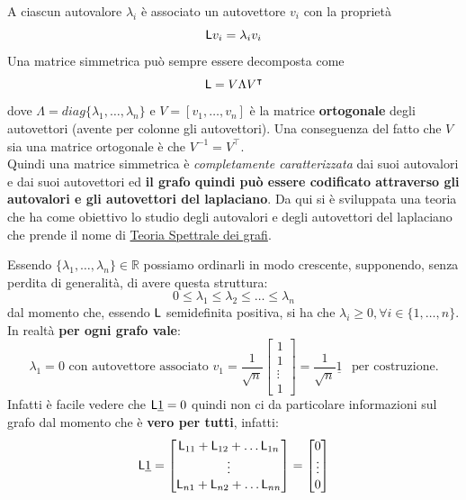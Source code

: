 A ciascun autovalore $\lambda_i$ \`e associato un autovettore $v_i$ con la propriet\`a
\begin{equation}
\mathsf{L} v_i = \lambda_i v_i
\end{equation}
Una matrice simmetrica pu\`o sempre essere decomposta come
\begin{equation}
\mathsf{L} = V \Lambda V^\intercal
\end{equation}
dove $\Lambda = diag\{\lambda_1, \dots, \lambda_n\}$ e $V = [v_1, \dots, v_n]$ \`e la matrice \textbf{ortogonale} degli autovettori (avente per colonne gli autovettori). Una conseguenza del fatto che $V$ sia una matrice ortogonale \`e che $V^{-1} = V^\intercal$.\\
Quindi una matrice simmetrica \`e \textit{completamente caratterizzata} dai suoi autovalori e dai suoi autovettori ed \textbf{il grafo quindi pu\`o essere codificato attraverso gli autovalori e gli autovettori del laplaciano}. Da qui si \`e sviluppata una teoria che ha come obiettivo lo studio degli autovalori e degli autovettori del laplaciano che prende il nome di \href{https://en.wikipedia.org/wiki/Spectral_graph_theory}{Teoria Spettrale dei grafi}.

Essendo $\{\lambda_1, \dots, \lambda_n\} \in \mathbb{R}$ possiamo ordinarli in modo crescente, supponendo, senza perdita di generalit\`a, di avere questa struttura:
\begin{equation}
0 \leq \lambda_1 \leq \lambda_2 \leq \dots \leq \lambda_n
\end{equation}
dal momento che, essendo $\mathsf{L}$ semidefinita positiva, si ha che $\lambda_i \geq 0, \forall i \in \{1, \dots, n\}$.\\
In realt\`a \textbf{per ogni grafo vale}:
\begin{equation}
\lambda_1 = 0 \text{ con autovettore associato } v_1 = \frac{1}{\sqrt{n}} \begin{bmatrix}
1 \\
1 \\
\vdots \\
1
\end{bmatrix} = \frac{1}{\sqrt{n}} \underline{1} \hspace{5pt}\text{ per costruzione.}
\end{equation}
Infatti \`e facile vedere che $\mathsf{L} \underline{1} = 0$ quindi non ci da particolare informazioni sul grafo dal momento che \`e \textbf{vero per tutti}, infatti:
\begin{equation}
\mathsf{L} \underline{1} = \begin{bmatrix}
\mathsf{L}_{11} + \mathsf{L}_{12} + \dots \mathsf{L}_{1n} \\
\vdots \\
\mathsf{L}_{n1} + \mathsf{L}_{n2} + \dots \mathsf{L}_{nn}
\end{bmatrix} = \begin{bmatrix}
0 \\
\vdots \\
0
\end{bmatrix}
\end{equation}

